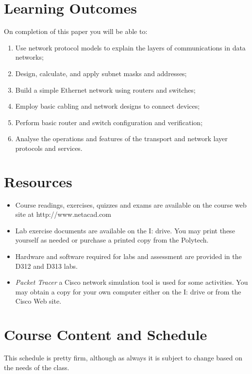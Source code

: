 \documentclass{article}
\begin{document}
\section*{Learning Outcomes}
On completion of this paper you will be able to:
\begin{enumerate}
  \item Use network protocol models to explain the layers of communications in data networks;
  \item Design, calculate, and apply subnet masks and addresses;
  \item Build a simple Ethernet network using routers and switches;
  \item Employ basic cabling and network designs to connect devices;
  \item Perform basic router and switch configuration and verification;
  \item Analyse the operations and features of the transport and network layer protocols and services.
\end{enumerate}

\section*{Resources}
\begin{itemize}
 \item Course readings, exercises, quizzes and exams are available on the course web site at http://www.netacad.com
 \item Lab exercise documents are available on the I: drive.  You may print these yourself as needed or purchase a printed copy from the Polytech.
 \item Hardware and software required for labs and assessment are provided in the D312 and D313 labs.
 \item \emph{Packet Tracer} a Cisco network simulation tool is used for some activities.  You may obtain a copy for your own computer either on the I: drive or from the Cisco Web site.
\end{itemize}


\section*{Course Content and Schedule}
This schedule is pretty firm, although as always it is subject to change based on the needs of the class.
\\
\end{document}
